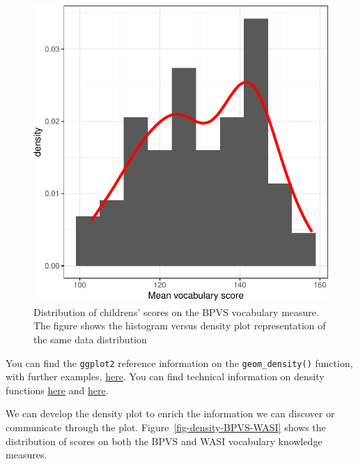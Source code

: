 \documentclass[
  letterpaper,
  DIV=11,
  numbers=noendperiod]{scrreprt}
\begin{document}
\begin{figure}

{\centering \includegraphics{visualization_files/figure-pdf/fig-density-demonstration-1.pdf}

}

\caption{\label{fig-density-demonstration}Distribution of childrens'
scores on the BPVS vocabulary measure. The figure shows the histogram
versus density plot representation of the same data distribution}

\end{figure}

You can find the \texttt{ggplot2} reference information on the
\texttt{geom\_density()} function, with further examples,
\href{https://ggplot2.tidyverse.org/reference/geom_density.html}{here}.
You can find technical information on density functions
\href{https://stackoverflow.com/questions/12394321/r-what-algorithm-does-geom-density-use-and-how-to-extract-points-equation-of}{here}
and
\href{https://en.wikipedia.org/wiki/Kernel_density_estimation}{here}.

We can develop the density plot to enrich the information we can
discover or communicate through the plot.
Figure~\ref{fig-density-BPVS-WASI} shows the distribution of scores on
both the BPVS and WASI vocabulary knowledge measures.
\end{document}
